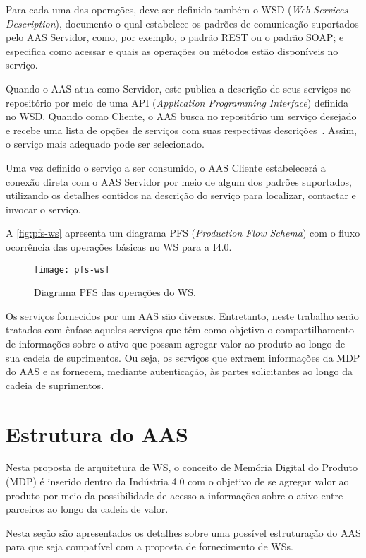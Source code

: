 	Para cada uma das operações, deve ser definido também o WSD (\textit{Web Services Description}), documento o qual estabelece os padrões de comunicação suportados pelo AAS Servidor, como, por exemplo, o padrão REST ou o padrão SOAP; e especifica como acessar e quais as operações ou métodos estão disponíveis no serviço. 
	
	Quando o AAS atua como Servidor, este publica a descrição de seus serviços no repositório por meio de uma API (\textit{Application Programming Interface}) definida no WSD. Quando como Cliente, o AAS busca no repositório um serviço desejado e recebe uma lista de opções de serviços com suas respectivas descrições~. Assim, o serviço mais adequado pode ser selecionado.
	
	Uma vez definido o serviço a ser consumido, o AAS Cliente estabelecerá a conexão direta com o AAS Servidor por meio de algum dos padrões suportados, utilizando os detalhes contidos na descrição do serviço para localizar, contactar e invocar o serviço.	
	
	A \autoref{fig:pfs-ws} apresenta um diagrama PFS (\textit{Production Flow Schema}) com o fluxo ocorrência das operações básicas no WS para a I4.0.
	
	\begin{figure}[htb]
		\centering
		\caption{Diagrama PFS das operações do WS.}
		\label{fig:pfs-ws}
		\texttt{[image: pfs-ws]}
	\end{figure}
	
	Os serviços fornecidos por um AAS são diversos. Entretanto, neste trabalho serão tratados com ênfase aqueles serviços que têm como objetivo o compartilhamento de informações sobre o ativo que possam agregar valor ao produto ao longo de sua cadeia de suprimentos. Ou seja, os serviços que extraem informações da MDP do AAS e as fornecem, mediante autenticação, às partes solicitantes ao longo da cadeia de suprimentos.

\section{Estrutura do AAS }

	Nesta proposta de arquitetura de WS, o conceito de Memória Digital do Produto (MDP) é inserido dentro da Indústria 4.0 com o objetivo de se agregar valor ao produto por meio da possibilidade de acesso a informações sobre o ativo entre parceiros ao longo da cadeia de valor.
	
	Nesta seção são apresentados os detalhes sobre uma possível estruturação do AAS para que seja compatível com a proposta de fornecimento de WSs.
	
